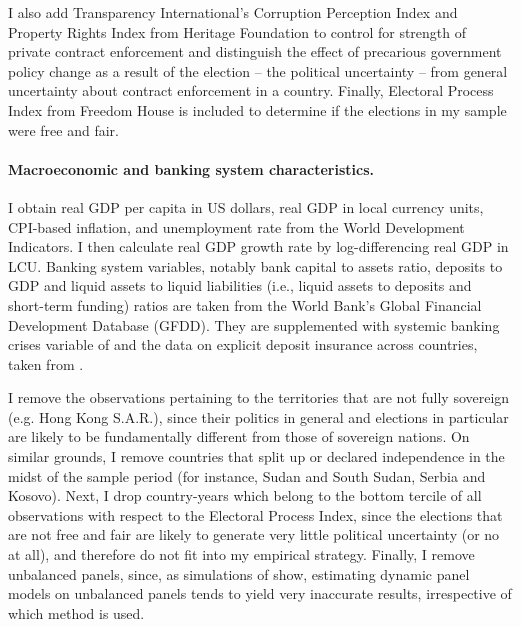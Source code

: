 \documentclass[12pt,a4paper]{article}
\begin{document}
I also add Transparency International's Corruption Perception Index and Property Rights Index from Heritage Foundation to control for strength of private contract enforcement and distinguish the effect of precarious government policy change as a result of the election -- the political uncertainty -- from general uncertainty about contract enforcement in a country. Finally, Electoral Process Index from Freedom House is included to determine if the elections in my sample were free and fair.

\afterpage{
	\begin{landscape}
		
		\clearpage
	\end{landscape}
			}

\paragraph{Macroeconomic and banking system characteristics.} I obtain real GDP per capita in US dollars, real GDP in local currency units, CPI-based inflation, and unemployment rate from the World Development Indicators. I then calculate real GDP growth rate by log-differencing real GDP in LCU. Banking system variables, notably bank capital to assets ratio, deposits to GDP and liquid assets to liquid liabilities (i.e., liquid assets to deposits and short-term funding) ratios are taken from the World Bank's Global Financial Development Database (GFDD). They are supplemented with systemic banking crises variable of \citet{laeven2012systemic} and the data on explicit deposit insurance across countries, taken from \citet{depinsurance}.

\vspace{6mm}

I remove the observations pertaining to the territories that are not fully sovereign (e.g. Hong Kong S.A.R.), since their politics in general and elections in particular are likely to be fundamentally different from those of sovereign nations. On similar grounds, I remove countries that split up or declared independence in the midst of the sample period (for instance, Sudan and South Sudan, Serbia and Kosovo). Next, I drop country-years which belong to the bottom tercile of all observations with respect to the Electoral Process Index, since the elections that are not free and fair are likely to generate very little political uncertainty (or no at all), and therefore do not fit into my empirical strategy. Finally, I remove unbalanced panels, since, as simulations of \citet{flannery2013estimating} show, estimating dynamic panel models on unbalanced panels tends to yield very inaccurate results, irrespective of which method is used.
\end{document}
